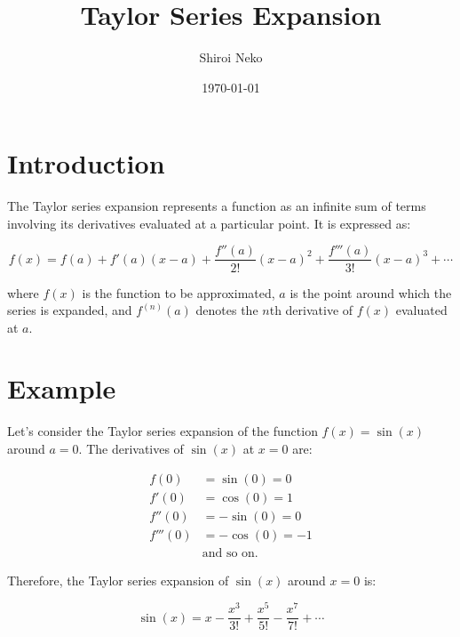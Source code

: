 \documentclass{article}
\begin{document}
\title{Taylor Series Expansion}
\author{Shiroi Neko}
\date{\today}

\maketitle

\section{Introduction}
The Taylor series expansion represents a function as an infinite sum of terms involving its derivatives evaluated at a particular point. It is expressed as:

\begin{equation}
f(x) = f(a) + f'(a)(x-a) + \frac{f''(a)}{2!}(x-a)^2 + \frac{f'''(a)}{3!}(x-a)^3 + \cdots
\end{equation}

where $f(x)$ is the function to be approximated, $a$ is the point around which the series is expanded, and $f^{(n)}(a)$ denotes the $n$th derivative of $f(x)$ evaluated at $a$.

\section{Example}
Let's consider the Taylor series expansion of the function $f(x) = \sin(x)$ around $a = 0$. The derivatives of $\sin(x)$ at $x=0$ are:

\begin{align*}
f(0) &= \sin(0) = 0 \\
f'(0) &= \cos(0) = 1 \\
f''(0) &= -\sin(0) = 0 \\
f'''(0) &= -\cos(0) = -1 \\
& \text{and so on.}
\end{align*}

Therefore, the Taylor series expansion of $\sin(x)$ around $x=0$ is:

\begin{equation}
\sin(x) = x - \frac{x^3}{3!} + \frac{x^5}{5!} - \frac{x^7}{7!} + \cdots
\end{equation}
\end{document}
